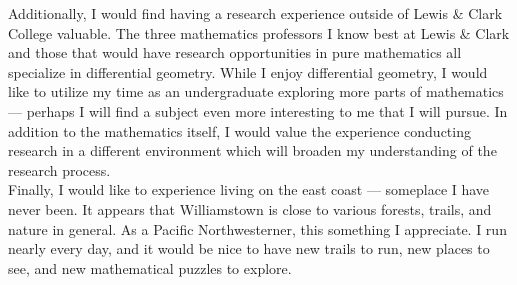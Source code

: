 \documentclass[12pt]{amsart}
\begin{document}
Additionally, I would find having a research experience outside of Lewis \&
Clark College valuable. The three mathematics professors I know best at
Lewis \& Clark and those that would have research opportunities in pure
mathematics all specialize in differential geometry. While I enjoy
differential geometry, I would like to utilize my time as an undergraduate
exploring more parts of mathematics --- perhaps I will find a subject even
more interesting to me that I will pursue. In addition to the mathematics
itself, I would value the experience conducting research in a different
environment which will broaden my understanding of the research process.\\

Finally, I would like to experience living on the east coast --- someplace I have never been.  It appears that Williamstown is close to various forests, trails, and nature in general. As a Pacific Northwesterner, this something I appreciate. I run nearly every day, and it would be nice to have new trails to run, new places to see, and new mathematical puzzles to explore.
\end{document}
